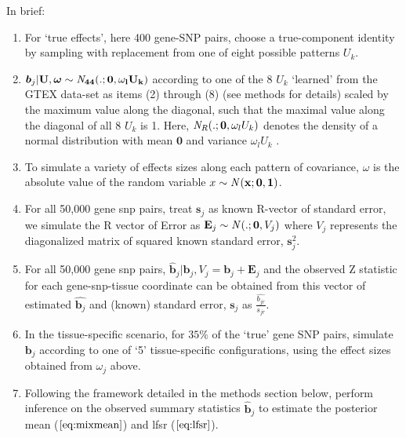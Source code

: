 In brief:
\begin{enumerate}
\item For `true effects', here 400 gene-SNP pairs, choose a true-component identity by sampling with replacement from one of eight possible patterns $U_{k}$.
\item $ \bm{b}_{j}  | \bf{U}, \bm{\omega} \sim{\it N}_{44} (.; \bm{0}, \omega_l U_{k})$ according to one of the 8 $U_{k}$ `learned' from the GTEX data-set as items (2) through (8) (see methods for details) scaled by the maximum value along the diagonal, such that the maximal value along the diagonal of all 8 $U_{k}$ is 1. Here, ${\it N}_R(.; \bm{0}, \omega_l U_{k})$ denotes the density of a normal distribution with mean $\bm{0}$ and variance $\omega_l U_{k}$ .
\item To simulate a variety of effects sizes along each pattern of covariance, $\omega$ is the absolute value of  the random variable $x \sim {\it N}(\bf{x}; \bm{0}, 1)$.
\item For all 50,000 gene snp pairs, treat $\textbf{s}_{j}$ as known R-vector of standard error, we simulate the R vector of Error as $\textbf{E}_{j} \sim {\it N} (.; \bm{0}, V_{j} )$ where $V_{j} $ represents the diagonalized matrix of squared known standard error, $\textbf{s}_{j}^{2}$. 
\item For all 50,000 gene snp pairs, $\hat{\bm{b}}_{j} | \bm{b}_{j} , V_{j} = \bm{b}_{j} + \textbf{E}_{j}$ %
and the observed Z statistic for each gene-snp-tissue coordinate can be obtained from this vector of estimated $\hat{\bm{b}_{j}}$ and (known) standard error, $\textbf{s}_{j}$ as $\frac{\hat{{b}_{jr}}}{s_{jr}}$.
\item In the tissue-specific scenario, for $35\%$ of the `true' gene SNP pairs, simulate $\bm{b}_{j}$ according to one of `5' tissue-specific configurations, using the effect sizes obtained from $\omega_{j}$ above.
\item Following the framework detailed in the methods section below, perform inference on the observed summary statistics $\hat{\bm{b}}_{j}$ to estimate the posterior mean ($\ref{eq:mixmean}$) and lfsr ($\ref{eq:lfsr}$). 
\end{enumerate}

